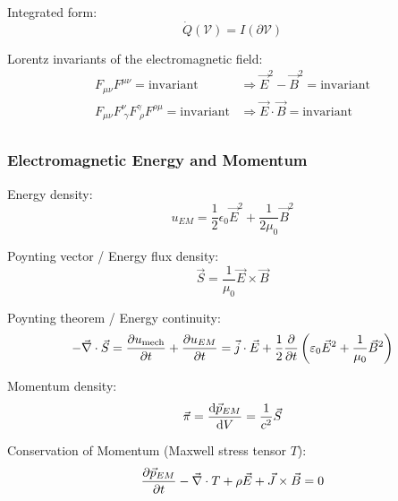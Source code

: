 		\noindent
		Integrated form:
		\begin{equation}
			\dot{Q}(\mathcal{V}) = I(\partial\mathcal{V})
		\end{equation}

		\noindent
		Lorentz invariants of the electromagnetic field:
		\begin{equation}
			\begin{aligned}
				F_{\mu\nu} F^{\mu\nu} = \mathrm{invariant} &\Rightarrow \vec{E}^2 - \vec{B}^2 = \mathrm{invariant} \\
				F_{\mu\nu} F^{\nu}_{\;\gamma} F^{\gamma}_{\;\rho} F^{\rho\mu} = \mathrm{invariant} &\Rightarrow \vec{E}\cdot \vec{B} = \mathrm{invariant} \\
			\end{aligned}
		\end{equation}

		\subsubsection{Electromagnetic Energy and Momentum}
			\noindent
			Energy density:
			\begin{equation}
				u_{EM}=\frac{1}{2}\epsilon_0 \vec{E}^2+\frac{1}{2\mu_0}\vec{B}^2
			\end{equation}

			\noindent
			Poynting vector / Energy flux density:
			\begin{equation}
				\vec{S} = \frac{1}{\mu_0}\vec{E}\times\vec{B}
			\end{equation}

			\noindent
			Poynting theorem / Energy continuity:
			\begin{equation}
				-\vec{\nabla}\cdot\vec{S}
				= \frac{\partial u_{\mathrm{mech}}}{\partial t} + \frac{\partial u_{EM}}{\partial t}
				= \vec{j}\cdot\vec{E} + \frac{1}{2}\frac{\partial }{\partial t}\left( \varepsilon_0\vec{E}^2 + \frac{1}{\mu_0}\vec{B}^2 \right)
			\end{equation}

			\noindent
			Momentum density:
			\begin{equation}
				\vec{\pi} = \frac{\mathrm{d} \vec{p}_{EM}}{\mathrm{d} V} = \frac{1}{c^2}\vec{S}
			\end{equation}

			\noindent
			Conservation of Momentum (Maxwell stress tensor $T$):
			\begin{equation}
				\frac{\partial \vec{p}_{EM}}{\partial t} - \vec{\nabla}\cdot T + \rho \vec{E} + \vec{J}\times\vec{B} = 0
			\end{equation}


